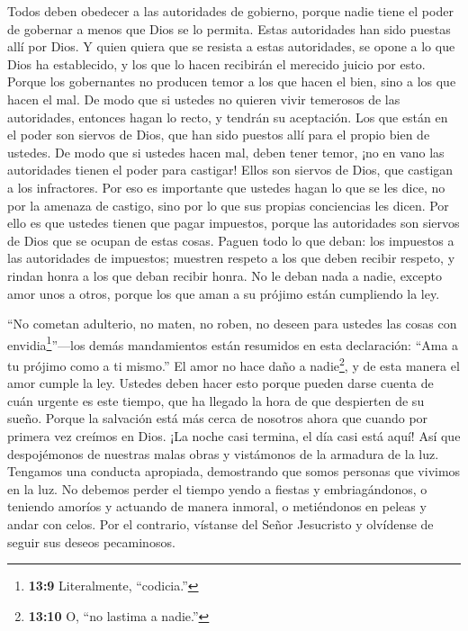 Todos deben obedecer a las autoridades de gobierno, porque
nadie tiene el poder de gobernar a menos que Dios se lo permita. Estas
autoridades han sido puestas allí por Dios.  Y quien quiera
que se resista a estas autoridades, se opone a lo que Dios ha
establecido, y los que lo hacen recibirán el merecido juicio por esto.
 Porque los gobernantes no producen temor a los que hacen el
bien, sino a los que hacen el mal. De modo que si ustedes no quieren
vivir temerosos de las autoridades, entonces hagan lo recto, y tendrán
su aceptación.  Los que están en el poder son siervos de
Dios, que han sido puestos allí para el propio bien de ustedes. De modo
que si ustedes hacen mal, deben tener temor, ¡no en vano las autoridades
tienen el poder para castigar! Ellos son siervos de Dios, que castigan a
los infractores.  Por eso es importante que ustedes hagan lo
que se les dice, no por la amenaza de castigo, sino por lo que sus
propias conciencias les dicen.  Por ello es que ustedes
tienen que pagar impuestos, porque las autoridades son siervos de Dios
que se ocupan de estas cosas.  Paguen todo lo que deban: los
impuestos a las autoridades de impuestos; muestren respeto a los que
deben recibir respeto, y rindan honra a los que deban recibir honra.
 No le deban nada a nadie, excepto amor unos a otros, porque
los que aman a su prójimo están cumpliendo la ley.

 ``No cometan adulterio, no maten, no roben, no deseen para
ustedes las cosas con envidia\footnote{\textbf{13:9} Literalmente,
  ``codicia.''}''---los demás mandamientos están resumidos en esta
declaración: ``Ama a tu prójimo como a ti mismo.''  El amor
no hace daño a nadie\footnote{\textbf{13:10} O, ``no lastima a nadie.''},
y de esta manera el amor cumple la ley.  Ustedes deben
hacer esto porque pueden darse cuenta de cuán urgente es este tiempo,
que ha llegado la hora de que despierten de su sueño. Porque la
salvación está más cerca de nosotros ahora que cuando por primera vez
creímos en Dios.  ¡La noche casi termina, el día casi está
aquí! Así que despojémonos de nuestras malas obras y vistámonos de la
armadura de la luz.  Tengamos una conducta apropiada,
demostrando que somos personas que vivimos en la luz. No debemos perder
el tiempo yendo a fiestas y embriagándonos, o teniendo amoríos y
actuando de manera inmoral, o metiéndonos en peleas y andar con celos.
 Por el contrario, vístanse del Señor Jesucristo y
olvídense de seguir sus deseos pecaminosos.


